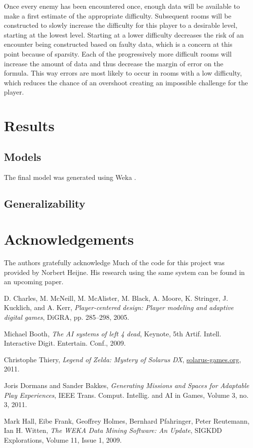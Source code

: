 \documentclass[a4paper]{article}
\begin{document}
\begin{multicols*}{2}
Once every enemy has been encountered once, enough data will be available to make a first estimate of the appropriate difficulty. Subsequent rooms will be constructed to slowly increase the difficulty for this player to a desirable level, starting at the lowest level. Starting at a lower difficulty decreases the risk of an encounter being constructed based on faulty data, which is a concern at this point because of sparsity. Each of the progressively more difficult rooms will increase the amount of data and thus decrease the margin of error on the formula. This way errors are most likely to occur in rooms with a low difficulty, which reduces the chance of an overshoot creating an impossible challenge for the player.

\section{Results} \label{fig:results}
\subsection{Models}
The final model was generated using Weka \cite{weka}.

\subsection{Generalizability}

\section{Acknowledgements}
The authors gratefully acknowledge Much of the code for this project was provided by Norbert Heijne. His research using the same system can be found in an upcoming paper.


\begin{thebibliography}{9}

D. Charles, M. McNeill, M. McAlister, M. Black, A. Moore, K. Stringer, J. Kucklich, and A. Kerr, 
\emph{Player-centered design: Player modeling and
adaptive digital games},
DiGRA, pp. 285–298,
2005.

Michael Booth,
\emph{The AI systems of left 4 dead},
Keynote, 5th Artif. Intell. Interactive Digit. Entertain. Conf.,
2009.

Christophe Thiery,
\emph{Legend of Zelda: Mystery of Solarus DX},
\url{solarus-games.org},
2011.

Joris Dormans and Sander Bakkes,
\emph{Generating Missions and Spaces for
Adaptable Play Experiences},
{IEEE} Trans. Comput. Intellig. and {AI} in Games, Volume 3, no. 3,
2011.

Mark Hall, Eibe Frank, Geoffrey Holmes, Bernhard Pfahringer, Peter Reutemann, Ian H. Witten,
\emph{The WEKA Data Mining Software: An Update},
SIGKDD Explorations, Volume 11, Issue 1,
2009.

\end{thebibliography}
\end{multicols*}
\end{document}
